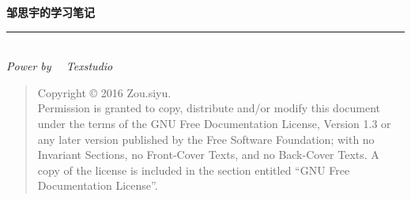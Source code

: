 \thispagestyle{empty}

\noindent\begin{minipage}{\textwidth}
\raggedleft
{\huge \bfseries 邹思宇的\LaTeXe{}学习笔记}
\noindent\rule[-1ex]{\textwidth}{5pt}\\[2.5ex]
\hfill\emph{\Large Power by \LaTeXe~~Texstudio}
\end{minipage}

\noindent{}


\begin{quote}\footnotesize
    Copyright \copyright{}  2016  Zou.siyu. \\
    Permission is granted to copy, distribute and/or modify this document
    under the terms of the GNU Free Documentation License, Version 1.3
    or any later version published by the Free Software Foundation;
    with no Invariant Sections, no Front-Cover Texts, and no Back-Cover Texts.
    A copy of the license is included in the section entitled ``GNU
    Free Documentation License''.
\end{quote}